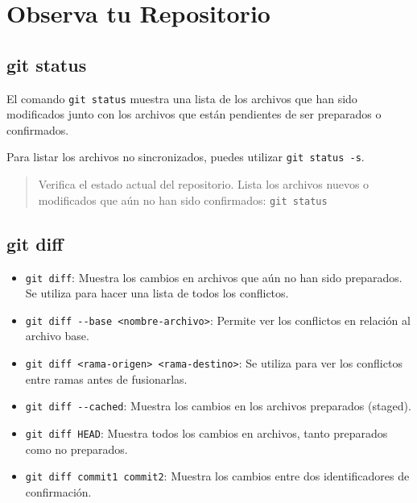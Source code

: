 \documentclass[
  letterpaper,
  DIV=11,
  numbers=noendperiod]{scrartcl}
\begin{document}
\hypertarget{observa-tu-repositorio}{%
\section{Observa tu Repositorio}\label{observa-tu-repositorio}}

\hypertarget{git-status}{%
\subsection{git status}\label{git-status}}

El comando \texttt{git\ status} muestra una lista de los archivos que
han sido modificados junto con los archivos que están pendientes de ser
preparados o confirmados.

Para listar los archivos no sincronizados, puedes utilizar
\texttt{git\ status\ -s}.

\begin{quote}
Verifica el estado actual del repositorio. Lista los archivos nuevos o
modificados que aún no han sido confirmados: \texttt{git\ status}
\end{quote}

\hypertarget{git-diff}{%
\subsection{git diff}\label{git-diff}}

\begin{itemize}
\item
  \texttt{git\ diff}: Muestra los cambios en archivos que aún no han
  sido preparados. Se utiliza para hacer una lista de todos los
  conflictos.
\item
  \texttt{git\ diff\ -\/-base\ \textless{}nombre-archivo\textgreater{}}:
  Permite ver los conflictos en relación al archivo base.
\item
  \texttt{git\ diff\ \textless{}rama-origen\textgreater{}\ \textless{}rama-destino\textgreater{}}:
  Se utiliza para ver los conflictos entre ramas antes de fusionarlas.
\item
  \texttt{git\ diff\ -\/-cached}: Muestra los cambios en los archivos
  preparados (staged).
\item
  \texttt{git\ diff\ HEAD}: Muestra todos los cambios en archivos, tanto
  preparados como no preparados.
\item
  \texttt{git\ diff\ commit1\ commit2}: Muestra los cambios entre dos
  identificadores de confirmación.
\end{itemize}
\end{document}
